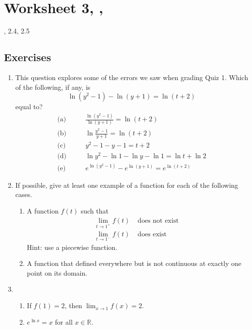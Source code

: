 \newpage\section*{Worksheet 3, \Course, \Semester} 
\noindent {}, 2.4, 2.5

\subsection*{Exercises}

\begin{enumerate}
	\item This question explores some of the errors we saw when grading Quiz 1. Which of the following, if any, is $$\ln(y^2 - 1) - \ln(y+1) =\ln(t+2)$$ equal to? 
    \begin{align*}
    	\text{(a)} & \qquad \frac{\ln(y^2 - 1)}{\ln(y+1)} =\ln(t+2) \\[8pt]   
    	\text{(b)} & \qquad \ln\frac{y^2 - 1}{y+1} =\ln(t+2) \\[8pt]   
    	\text{(c)} & \qquad y^2 - 1 - y - 1 = t+2  \\[8pt]         
    	\text{(d)} & \qquad \ln y^2 - \ln 1 - \ln y - \ln 1 = \ln t + \ln 2 \\[8pt]
    	\text{(e)} & \qquad e^{\ln(y^2 - 1)} - e^{\ln(y+1)} = e^{\ln(t+2)} 
    \end{align*}   

    \item If possible, give at least one example of a function for each of the following cases.
    \begin{enumerate}
        \item A function $f(t)$ such that
        \begin{align*}
        \lim_{t \rightarrow 1^+} f(t) & \text{ does not exist } \\ 
        \lim_{t \rightarrow 1^-} f(t) & \text{ does exist }
        \end{align*}
        Hint: use a piecewise function.
        \item A function that defined everywhere but is not continuous at exactly one point on its domain.
    \end{enumerate}
    
    \item \TorF
    \begin{enumerate}
    	\item If $f(1) = 2$, then $\displaystyle{\lim_{x\rightarrow 1}} f(x) = 2$.  
        \item $e^{\ln x} = x$ for all $x \in \mathbb R$.
    \end{enumerate}
    

\end{enumerate}
